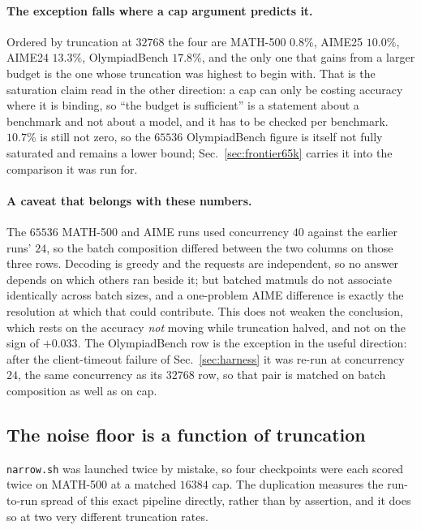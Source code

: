 \paragraph{The exception falls where a cap argument predicts it.} Ordered by truncation at
$32768$ the four are MATH-500 $0.8\%$, AIME25 $10.0\%$, AIME24 $13.3\%$, OlympiadBench
$17.8\%$, and the only one that gains from a larger budget is the one whose truncation was
highest to begin with. That is the saturation claim read in the other direction: a cap can
only be costing accuracy where it is binding, so ``the budget is sufficient'' is a statement
about a benchmark and not about a model, and it has to be checked per benchmark. $10.7\%$ is
still not zero, so the $65536$ OlympiadBench figure is itself not fully saturated and remains
a lower bound; Sec.~\ref{sec:frontier65k} carries it into the comparison it was run for.

\paragraph{A caveat that belongs with these numbers.} The $65536$ MATH-500 and AIME runs used
concurrency $40$ against the earlier runs' $24$, so the batch composition differed between
the two columns on those three rows. Decoding is greedy and the requests are independent, so
no answer depends on which others ran beside it; but batched matmuls do not associate
identically across batch sizes, and a one-problem AIME difference is exactly the resolution
at which that could contribute. This does not weaken the conclusion, which rests on the
accuracy \emph{not} moving while truncation halved, and not on the sign of $+0.033$. The
OlympiadBench row is the exception in the useful direction: after the client-timeout failure
of Sec.~\ref{sec:harness} it was re-run at concurrency $24$, the same concurrency as its
$32768$ row, so that pair is matched on batch composition as well as on cap.

\subsection{The noise floor is a function of truncation}
\label{sec:noisetrunc}

\texttt{narrow.sh} was launched twice by mistake, so four checkpoints were each scored twice
on MATH-500 at a matched $16384$ cap. The duplication measures the run-to-run spread of this
exact pipeline directly, rather than by assertion, and it does so at two very different
truncation rates.

